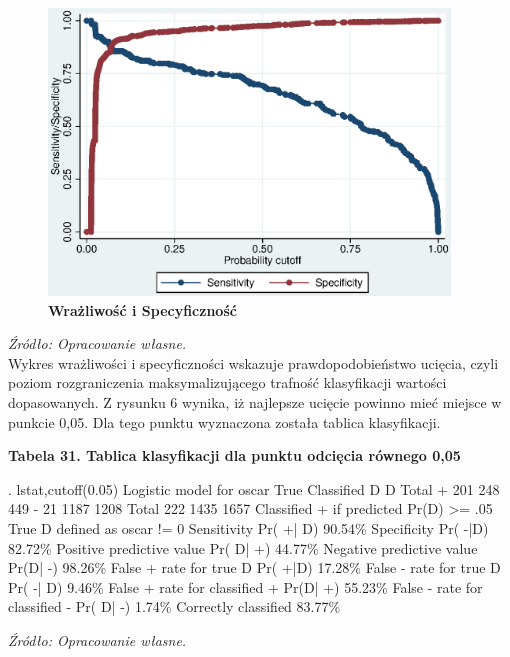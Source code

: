 \vspace{0.5cm}
\begin{figure}[h]
\begin{centering}
  \includegraphics[height=3in]{Rysunki//SENS2}
    \caption{\textbf{Wrażliwość i Specyficzność}}
\end{centering}
\end{figure}
\textit{\footnotesize{Źródło: Opracowanie własne.}} \\

Wykres wrażliwości i specyficzności wskazuje prawdopodobieństwo ucięcia, czyli poziom rozgraniczenia maksymalizującego trafność klasyfikacji wartości dopasowanych. Z rysunku 6 wynika, iż najlepsze ucięcie powinno mieć miejsce w punkcie 0,05. Dla tego punktu wyznaczona została tablica klasyfikacji.

\vspace{0.5cm}
\textbf{Tabela 31. Tablica klasyfikacji dla punktu odcięcia równego 0,05 }
\begin{stlog}
. lstat,cutoff(0.05)
{\smallskip}
Logistic model for oscar
{\smallskip}
               True 
Classified {\VBAR}         D            {\tytilde}D  {\VBAR}      Total
     +     {\VBAR}       201           248  {\VBAR}        449
     -     {\VBAR}        21          1187  {\VBAR}       1208
   Total   {\VBAR}       222          1435  {\VBAR}       1657
\vspace{0.3cm}
Classified + if predicted Pr(D) >= .05
True D defined as oscar != 0
Sensitivity                     Pr( +| D)   90.54\%
Specificity                     Pr( -|{\tytilde}D)   82.72\%
Positive predictive value       Pr( D| +)   44.77\%
Negative predictive value       Pr({\tytilde}D| -)   98.26\%
False + rate for true {\tytilde}D        Pr( +|{\tytilde}D)   17.28\%
False - rate for true D         Pr( -| D)    9.46\%
False + rate for classified +   Pr({\tytilde}D| +)   55.23\%
False - rate for classified -   Pr( D| -)    1.74\%
Correctly classified                        83.77\%
 \end{stlog}
\textit{\footnotesize{Źródło: Opracowanie własne.}} \\

